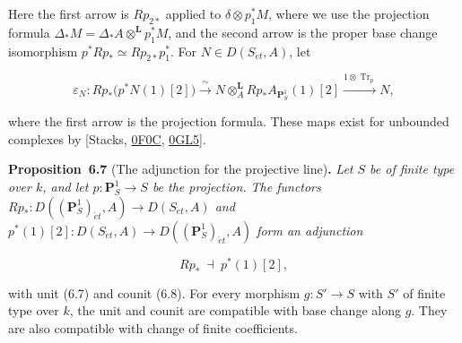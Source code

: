 \documentclass[11pt]{article}
\newenvironment{bpstatement}[2]{\par\addvspace{0.6\baselineskip}\noindent\textbf{#1}#2\textbf{.}\enspace\ignorespaces}
  {\par\addvspace{0.4\baselineskip}}
\newenvironment{bpstatementit}[2]{\begin{bpstatement}{#1}{#2}\itshape\ignorespaces}{\end{bpstatement}}
\begin{document}
Here the first arrow is \(Rp_{2*}\) applied to \(\delta\otimes p_1^*M\), where we use the projection formula \(\Delta_*M=\Delta_*A\otimes^{\mathbf L}p_1^*M\), and the second arrow is the proper base change isomorphism \(p^*Rp_*\simeq Rp_{2*}p_1^*\). For \(N\in D(S_{\acute{e}t},A)\), let

\[
\varepsilon_N:Rp_*\bigl(p^*N(1)[2]\bigr)
\xrightarrow{\ \sim\ }N\otimes_A^{\mathbf L}
Rp_*A_{\mathbf P^1_S}(1)[2]
\xrightarrow{1\otimes \operatorname{Tr}_p}N,
\tag{6.8}
\]

where the first arrow is the projection formula. These maps exist for unbounded complexes by [Stacks, \href{https://stacks.math.columbia.edu/tag/0F0C}{0F0C}, \href{https://stacks.math.columbia.edu/tag/0GL5}{0GL5}].

\label{bp22}%
\begin{bpstatementit}{Proposition~6.7}{ (The adjunction for the projective line)}
Let \(S\) be of finite type over \(k\), and let \(p:\mathbf P^1_S\to S\) be the projection. The functors \(Rp_*:D((\mathbf P^1_S)_{\acute{e}t},A)\to
D(S_{\acute{e}t},A)\) and \(p^*(1)[2]:D(S_{\acute{e}t},A)\to
D((\mathbf P^1_S)_{\acute{e}t},A)\) form an adjunction

\[
Rp_* \ \dashv\ p^*(1)[2],
\tag{6.9}
\]

with unit (6.7) and counit (6.8). For every morphism \(g:S'\to S\) with \(S'\) of finite type over \(k\), the unit and counit are compatible with base change along \(g\). They are also compatible with change of finite coefficients.
\end{bpstatementit}
\end{document}
